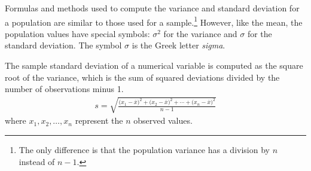 Formulas and methods used to compute the variance and standard deviation for a population are similar to those used for a sample.\footnote{The only difference is that the population variance has a division by $n$ instead of $n-1$.} However, like the mean, the population values have special symbols: $\sigma_{}^2$ for the variance and $\sigma$ for the standard deviation. The symbol $\sigma$  is the Greek letter \emph{sigma}.

\begin{termBox}{
		The sample standard deviation of a numerical variable is computed as the square root of the variance, which is the sum of squared deviations divided by the number of observations minus 1.
		\begin{eqnarray}
		s = \sqrt{\frac{({x_1 - \overline{x})}^{2}+({x_2 - \overline{x})}^{2}+\cdots+({x_n - \overline{x})}^{2}}{n-1}}
		\label{SDEquation}
		\end{eqnarray}
		where $x_1, x_2, \dots, x_n$ represent the $n$ observed values.}
\end{termBox}

